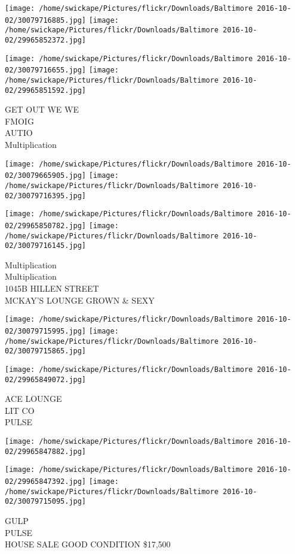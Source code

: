 \documentclass[10pt,letterpaper]{article}
\begin{document}
\texttt{[image: /home/swickape/Pictures/flickr/Downloads/Baltimore 2016-10-02/30079716885.jpg]}
\texttt{[image: /home/swickape/Pictures/flickr/Downloads/Baltimore 2016-10-02/29965852372.jpg]}

\texttt{[image: /home/swickape/Pictures/flickr/Downloads/Baltimore 2016-10-02/30079716655.jpg]}
\texttt{[image: /home/swickape/Pictures/flickr/Downloads/Baltimore 2016-10-02/29965851592.jpg]}

GET OUT WE WE\\
FMOIG\\
AUTIO\\
Multiplication
\pagebreak

\texttt{[image: /home/swickape/Pictures/flickr/Downloads/Baltimore 2016-10-02/30079665905.jpg]}
\texttt{[image: /home/swickape/Pictures/flickr/Downloads/Baltimore 2016-10-02/30079716395.jpg]}

\texttt{[image: /home/swickape/Pictures/flickr/Downloads/Baltimore 2016-10-02/29965850782.jpg]}
\texttt{[image: /home/swickape/Pictures/flickr/Downloads/Baltimore 2016-10-02/30079716145.jpg]}

Multiplication\\
Multiplication\\
1045B HILLEN STREET\\
MCKAY'S LOUNGE GROWN \& SEXY
\pagebreak

\texttt{[image: /home/swickape/Pictures/flickr/Downloads/Baltimore 2016-10-02/30079715995.jpg]}
\texttt{[image: /home/swickape/Pictures/flickr/Downloads/Baltimore 2016-10-02/30079715865.jpg]}

\texttt{[image: /home/swickape/Pictures/flickr/Downloads/Baltimore 2016-10-02/29965849072.jpg]}

ACE LOUNGE\\
LIT CO\\
PULSE
\pagebreak

\texttt{[image: /home/swickape/Pictures/flickr/Downloads/Baltimore 2016-10-02/29965847882.jpg]}

\vspace{0.25in}
\texttt{[image: /home/swickape/Pictures/flickr/Downloads/Baltimore 2016-10-02/29965847392.jpg]}
\texttt{[image: /home/swickape/Pictures/flickr/Downloads/Baltimore 2016-10-02/30079715095.jpg]}

GULP\\
PULSE\\
HOUSE SALE GOOD CONDITION \$17,500
\pagebreak
\end{document}
